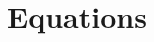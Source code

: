 \documentclass[a4paper,12pt]{article}
\begin{document}

\section{Equations}\label{AppB}

\end{document}
